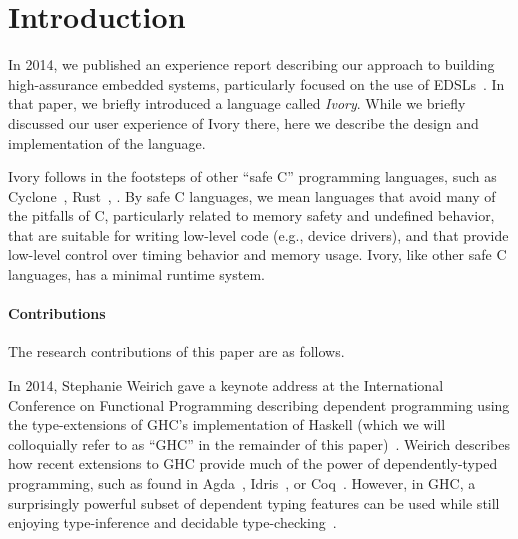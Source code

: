 \section{Introduction}
\label{sec:introduction}


In 2014, we published an experience report describing our approach to building
high-assurance embedded systems, particularly focused on the use of
EDSLs~\cite{smaccm}. In that paper, we briefly introduced a language called
\emph{Ivory}. While we briefly discussed our user experience of Ivory there,
here we describe the design and implementation of the language.

Ivory follows in the footsteps of other ``safe C'' programming languages, such
as Cyclone~\cite{}, Rust~\cite{}, . By safe C languages, we mean
languages that avoid many of the pitfalls of C, particularly related to memory
safety and undefined behavior, that are suitable for writing low-level code
(e.g., device drivers), and that provide low-level control over timing behavior
and memory usage. Ivory, like other safe C languages, has a minimal runtime
system.


\paragraph{Contributions}
The research contributions of this paper are as follows.

In 2014, Stephanie Weirich gave a keynote address at the International
Conference on Functional Programming describing dependent programming using the
type-extensions of GHC's implementation of Haskell (which we will colloquially
refer to as ``GHC'' in the remainder of this
paper)~\cite{weirich-keynote}. Weirich describes how recent extensions to GHC
provide much of the power of dependently-typed programming, such as found in
Agda~\cite{}, Idris~\cite{}, or Coq~\cite{}. However, in GHC, a surprisingly
powerful subset of dependent typing features can be used while still enjoying
type-inference and decidable type-checking~\cite{dephaskell}.

